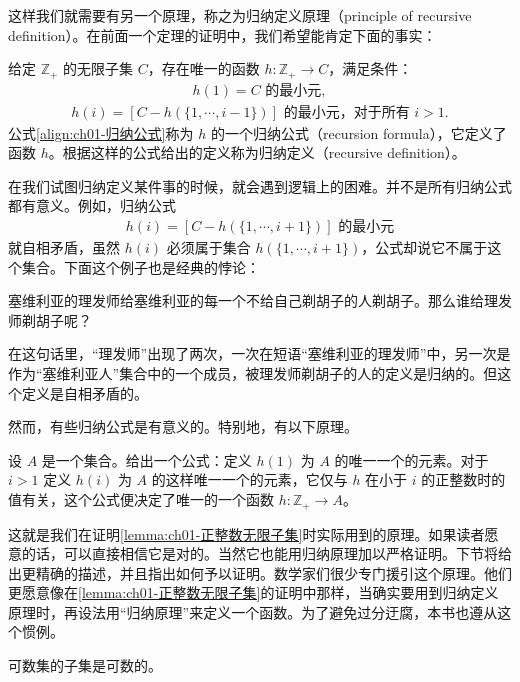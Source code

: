 \documentclass[../../main.tex]{subfiles}
\begin{document}
这样我们就需要有另一个原理，称之为归纳定义原理（principle of recursive definition）。在前面一个定理的证明中，我们希望能肯定下面的事实：

给定 $\mathbb{Z}_{+}$ 的无限子集 $C$，存在唯一的函数 $h: \mathbb{Z}_{+} \longrightarrow C$，满足条件：
\begin{align}
h(1) = C \text{ 的最小元},\label{align:ch01-归纳公式}
\end{align}
\begin{align*}
h(i) = [C - h(\{1, \cdots, i-1\})] \text{ 的最小元，对于所有 } i > 1.
\end{align*}
公式\eqref{align:ch01-归纳公式}称为 $h$ 的一个归纳公式（recursion formula），它定义了函数 $h$。根据这样的公式给出的定义称为归纳定义（recursive definition）。

在我们试图归纳定义某件事的时候，就会遇到逻辑上的困难。并不是所有归纳公式都有意义。例如，归纳公式
\begin{align*}
h(i) = [C - h(\{1, \cdots, i+1\})] \text{ 的最小元}
\end{align*}
就自相矛盾，虽然 $h(i)$ 必须属于集合 $h(\{1, \cdots, i+1\})$，公式却说它不属于这个集合。下面这个例子也是经典的悖论：

塞维利亚的理发师给塞维利亚的每一个不给自己剃胡子的人剃胡子。那么谁给理发师剃胡子呢？

在这句话里，“理发师”出现了两次，一次在短语“塞维利亚的理发师”中，另一次是作为“塞维利亚人”集合中的一个成员，被理发师剃胡子的人的定义是归纳的。但这个定义是自相矛盾的。

然而，有些归纳公式是有意义的。特别地，有以下原理。

\begin{axiom}[归纳定义原理]\label{axiom:ch01-归纳定义}
设 $A$ 是一个集合。给出一个公式：定义 $h(1)$ 为 $A$ 的唯一一个的元素。对于 $i > 1$ 定义 $h(i)$ 为 $A$ 的这样唯一一个的元素，它仅与 $h$ 在小于 $i$ 的正整数时的值有关，这个公式便决定了唯一的一个函数 $h: \mathbb{Z}_{+} \longrightarrow A$。
\end{axiom}

这就是我们在证明\cref{lemma:ch01-正整数无限子集}时实际用到的原理。如果读者愿意的话，可以直接相信它是对的。当然它也能用归纳原理加以严格证明。下节将给出更精确的描述，并且指出如何予以证明。数学家们很少专门援引这个原理。他们更愿意像在\cref{lemma:ch01-正整数无限子集}的证明中那样，当确实要用到归纳定义原理时，再设法用“归纳原理”来定义一个函数。为了避免过分迂腐，本书也遵从这个惯例。

\begin{corollary}\label{corollary:ch01-可数子集}
可数集的子集是可数的。
\end{corollary}
\end{document}
